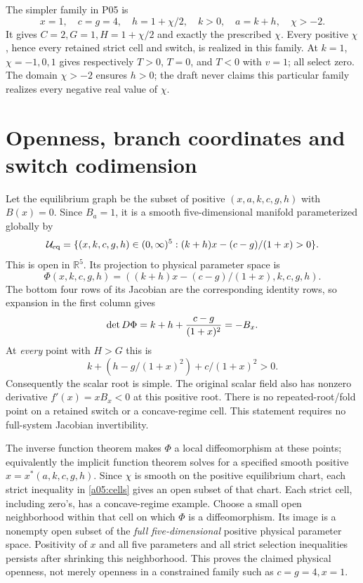 \documentclass[11pt]{article}
\newcommand{\RR}{\mathbb R}
\begin{document}
The simpler family in P05 is
\begin{equation}
 x=1,\quad c=g=4,\quad h=1+\chi/2,\quad k>0,\quad
 a=k+h,\quad\chi>-2. \label{a05:family}
\end{equation}
It gives $C=2,G=1,H=1+\chi/2$ and exactly the prescribed $\chi$.
Every positive $\chi$, hence every retained strict cell and switch, is
realized in this family. At $k=1$, $\chi=-1,0,1$ gives respectively
$T>0$, $T=0$, and $T<0$ with $v=1$; all select zero. The domain
$\chi>-2$ ensures $h>0$; the draft never claims this particular
family realizes every negative real value of $\chi$.

\section{Openness, branch coordinates and switch codimension}
Let the equilibrium graph be the subset of positive
$(x,a,k,c,g,h)$ with $B(x)=0$. Since $B_a=1$, it is a smooth
five-dimensional manifold parameterized globally by
\[
 \mathcal U_{\rm eq}=\{(x,k,c,g,h)\in(0,\infty)^5:
 (k+h)x-(c-g)/(1+x)>0\}.
\]
This is open in $\RR^5$. Its projection to physical parameter space is
\[
 \Phi(x,k,c,g,h)=((k+h)x-(c-g)/(1+x),k,c,g,h).
\]
The bottom four rows of its Jacobian are the corresponding identity rows,
so expansion in the first column gives
\[
 \det D\Phi=k+h+{c-g\over(1+x)^2}=-B_x.
\]
At \emph{every} point with $H>G$ this is
\[
 k+(h-g/(1+x)^2)+c/(1+x)^2>0. \label{a05:regularity}
\]
Consequently the scalar root is simple. The original scalar field also
has nonzero derivative $f'(x)=xB_x<0$ at this positive root. There is
no repeated-root/fold point on a retained switch or a concave-regime
cell. This statement requires no full-system Jacobian invertibility.

The inverse function theorem makes $\Phi$ a local diffeomorphism at
these points; equivalently the implicit function theorem solves for a
specified smooth positive $x=x^*(a,k,c,g,h)$. Since $\chi$ is smooth
on the positive equilibrium chart, each strict inequality in
\eqref{a05:cells} gives an open subset of that chart. Each strict cell,
including zero's, has a concave-regime example. Choose a small open
neighborhood within that cell on which $\Phi$ is a diffeomorphism.
Its image is a nonempty open subset of the \emph{full five-dimensional}
positive physical parameter space. Positivity of $x$ and all five
parameters and all strict selection inequalities persists after shrinking
this neighborhood. This proves the claimed physical openness, not
merely openness in a constrained family such as $c=g=4,x=1$.
\end{document}
